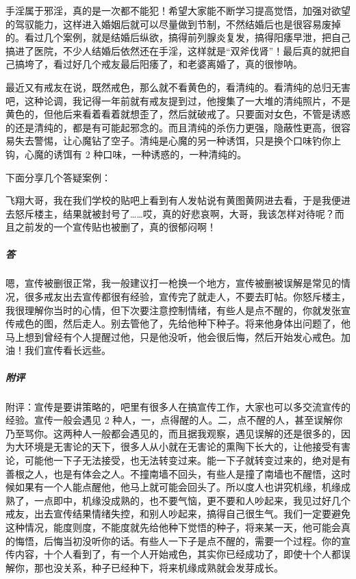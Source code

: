 手淫属于邪淫，真的是一次都不能犯！希望大家能不断学习提高觉悟，加强对欲望的驾驭能力，这样进入婚姻后就可以尽量做到节制，不然结婚后也是很容易废掉的。看过几个案例，就是结婚后纵欲，搞得前列腺炎复发，搞得阳痿早泄，把自己搞进了医院，不少人结婚后依然还在手淫，这样就是“双斧伐肾”！最后真的就把自己搞垮了，看过好几个戒友最后阳痿了，和老婆离婚了，真的很惨呐。

最近又有戒友在说，既然戒色，那么就不看黄色的，看清纯的。看清纯的总归无害吧，这种论调，我记得一年前就有戒友提到过，他搜集了一大堆的清纯照片，不是黄色的，但他后来看着看着就想歪了，然后就破戒了。只要面对女色，不管是诱惑的还是清纯的，都是有可能起邪念的。而且清纯的杀伤力更强，隐蔽性更高，很容易失去警惕，让心魔钻了空子。清纯是心魔的另一种诱饵，只是换个口味钓你上钩，心魔的诱饵有 2 种口味，一种诱惑的，一种清纯的。

下面分享几个答疑案例：

\begin{case}
    飞翔大哥，我在我们学校的贴吧上看到有人发帖说有黄图黄网进去看，于是我便进去怒斥楼主，结果就被封号了……哎，真的好悲哀啊，大哥，我该怎样对待呢？而且之前发的一个宣传贴也被删了，真的很郁闷啊！
    \subparagraph{答} 嗯，宣传被删很正常，我一般建议打一枪换一个地方，宣传被删被误解是常见的情况，很多戒友出去宣传都很有经验，宣传完了就走人，不要去盯帖。你怒斥楼主，我很理解你当时的心情，但下次要注意控制情绪，有些人是点不醒的，你就发张宣传戒色的图，然后走人。别去管他了，先给他种下种子。将来他身体出问题了，他马上想到曾经有个人提醒过他，只是他没听，他会很后悔，然后开始发心戒色。加油！我们宣传看长远些。
    \subparagraph{附评} 附评：宣传是要讲策略的，吧里有很多人在搞宣传工作，大家也可以多交流宣传的经验。宣传一般会遇见 2 种人，一，点得醒的人。二，点不醒的人，甚至误解你乃至骂你。这两种人一般都会遇见的，而且据我观察，遇见误解的还是很多的，因为大环境是无害论的天下，很多人从小就在无害论的熏陶下长大的，让他接受有害论，可能他一下子无法接受，也无法转变过来。能一下子就转变过来的，绝对是有善根之人，也是有体会之人。不撞南墙不回头，有些人是撞了南墙也不醒悟，这时候如果有一个人能点醒他，他马上就可能会回头了。所以度人也讲究机缘，机缘成熟了，一点即中，机缘没成熟的，也不要气恼，更不要和人吵起来，我见过好几个戒友，出去宣传结果情绪失控，和别人吵起来，搞得自己很生气。我们一定要避免这种情况，能度则度，不能度就先给他种下觉悟的种子，将来某一天，他可能会真的悔悟，后悔当初没听你的话。有些人一下子是点不醒的，需要一个过程。你的宣传内容，十个人看到了，有一个人开始戒色，其实你已经成功了，即使十个人都误解你，那也没关系，种子已经种下，将来机缘成熟就会发芽成长。
\end{case}

